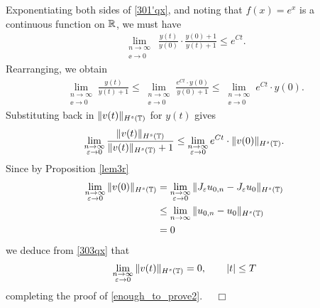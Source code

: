 Exponentiating both sides of \eqref{301'qx}, and noting that $f(x) = e^x$
is a continuous function on $\mathbb{R}$, we must have
\begin{equation*}
	\begin{split}
		\lim_{\substack{n \to \infty \\ \ee \to 0} } \
		\frac{y(t)}{y(0)} \cdot \frac{y(0) + 1}{y(t) + 1} \le e^{C t}.
	\end{split}
\end{equation*}
Rearranging, we obtain
\begin{equation*}
	\begin{split}
		\lim_{\substack{n \to \infty \\ \ee \to 0}} \frac{y(t)}{y(t) + 1}
		\le \lim_{\substack{n \to \infty \\ \ee \to 0}} \frac{e^{C t} \cdot y(0)}{y(0) + 1} \le
		\lim_{\substack{n \to \infty \\ \ee \to 0}} e^{C t} \cdot y(0).
	\end{split}
\end{equation*}
Substituting back in $\|v(t)\|_{H^s(\mathbb{T})}$ for $y(t)$ gives
\begin{equation}
	\begin{split}
		\lim_{\substack{n \to \infty \\ \varepsilon \to 0}}	\frac{\|v(t)\|_{H^s(\mathbb{T})}}{\|v(t)\|_{H^s(\mathbb{T})} + 1}  \le
		\lim_{\substack{n \to \infty \\ \varepsilon \to 0}} e^{C t} \cdot \|v(0)\|_{H^s(\mathbb{T})}.
		\label{303qx}
	\end{split}
\end{equation}
Since by Proposition \ref{lem3r} 
\begin{equation*}
	\begin{split}
	\lim_{\substack{n \to \infty \\ \varepsilon \to 0} }
	\|v(0)\|_{H^s(\mathbb{T})}
	& = \lim_{\substack{n \to \infty \\ \varepsilon \to 0} }
	\|J_\varepsilon u_{0,n} - J_\varepsilon u_0 \|_{H^s(\mathbb{T})} 
	\\
	& \le \lim_{n \to \infty } \|u_{0,n} - u_0 \|_{H^s(\mathbb{T})}
	\\
	& = 0
	\end{split}
\end{equation*}
we deduce from \eqref{303qx} that
\begin{equation*}
	\begin{split}
		\lim_{\substack{n \to \infty \\ \varepsilon \to 0}} \|v(t)\|_{H^s(\mathbb{T})} = 0, \qquad |t| \le T
	\end{split}
\end{equation*}
completing the proof of \eqref{enough_to_prove2}. $\quad \Box$
%
%
%
